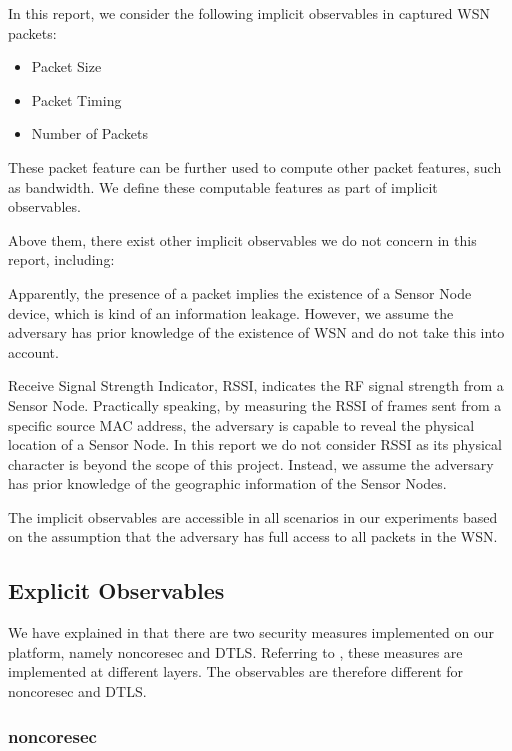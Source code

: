 In this report, we consider the following implicit observables in captured WSN packets:

\begin{itemize}
	\item Packet Size
	\item Packet Timing
	\item Number of Packets
\end{itemize}

These packet feature can be further used to compute other packet features, such as bandwidth. We define these computable features as part of implicit observables.

Above them, there exist other implicit observables we do not concern in this report, including:
\begin{description}[style=nextline]
	\item[Presence of Packets]
	Apparently, the presence of a packet implies the existence of a Sensor Node device, which is kind of an information leakage. However, we assume the adversary has prior knowledge of the existence of WSN and do not take this into account.
	
	\item[RSSI]
	Receive Signal Strength Indicator, RSSI, indicates the RF signal strength from a Sensor Node. Practically speaking, by measuring the RSSI of frames sent from a specific source MAC address, the adversary is capable to reveal the physical location of a Sensor Node. In this report we do not consider RSSI as its physical character is beyond the scope of this project. Instead, we assume the adversary has prior knowledge of the geographic information of the Sensor Nodes.
\end{description}

The implicit observables are accessible in all scenarios in our experiments based on the assumption that the adversary has full access to all packets in the WSN.

\subsection{Explicit Observables}

We have explained in  that there are two security measures implemented on our platform, namely noncoresec and DTLS. Referring to , these measures are implemented at different layers. The observables are therefore different for noncoresec and DTLS. 

\subsubsection{noncoresec} \label{Subsubsec: Explicit noncoresec}

